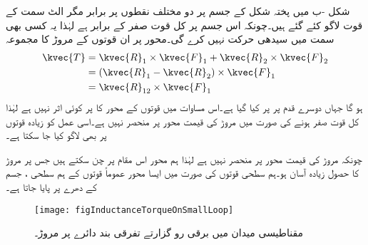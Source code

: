 شکل -ب میں  پختہ شکل کے جسم پر دو مختلف نقطوں پر برابر مگر الٹ سمت کے قوت لاگو کئے گئے ہیں۔چونکہ اس جسم پر کل قوت صفر کے برابر ہے لہٰذا یہ کسی بھی سمت میں سیدھی حرکت نہیں کرے گی۔محور  پر ان قوتوں کے مروڑ کا مجموعہ
\begin{align*}
\kvec{T}&=\kvec{R}_1 \times \kvec{F}_1+\kvec{R}_2 \times \kvec{F}_2\\
&=(\kvec{R}_1-\kvec{R}_2) \times \kvec{F}_1\\
&=\kvec{R}_{12} \times \kvec{F}_1
\end{align*}
ہو گا جہاں دوسرے قدم پر   پر کیا گیا ہے۔اس مساوات میں قوتوں کے محور کا  پر کوئی اثر نہیں ہے لہٰذا کل قوت صفر ہونے کی صورت میں مروڑ کی قیمت محور پر منحصر نہیں ہے۔اسی عمل کو زیادہ قوتوں پر بھی لاگو کیا جا سکتا ہے۔

چونکہ مروڑ کی قیمت محور پر منحصر نہیں ہے لہٰذا ہم محور اس مقام پر چن سکتے ہیں جس پر مروڑ کا حصول زیادہ آسان ہو۔ہم سطحی قوتوں کی صورت میں ایسا محور عموماً قوتوں کے ہم سطحی ، جسم  کے دھرے پر پایا جاتا ہے۔

\begin{figure}
\centering
\texttt{[image: figInductanceTorqueOnSmallLoop]}
\caption{مقناطیسی میدان میں برقی رو گزارتے تفرقی بند دائرے پر مروڑ۔}
\label{شکل_امالہ-تفرقی_دائرے_پر_مروڑ}
\end{figure}

